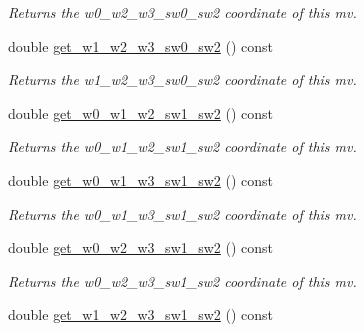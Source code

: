 \begin{DoxyCompactItemize}
\begin{DoxyCompactList}\small\item\em Returns the w0\-\_\-w2\-\_\-w3\-\_\-sw0\-\_\-sw2 coordinate of this mv. \end{DoxyCompactList}\item 
\hypertarget{classe3ga_1_1mv_abbe5b7757b57fbc209631c81670618ac}{double \hyperlink{classe3ga_1_1mv_abbe5b7757b57fbc209631c81670618ac}{get\-\_\-w1\-\_\-w2\-\_\-w3\-\_\-sw0\-\_\-sw2} () const }\label{classe3ga_1_1mv_abbe5b7757b57fbc209631c81670618ac}

\begin{DoxyCompactList}\small\item\em Returns the w1\-\_\-w2\-\_\-w3\-\_\-sw0\-\_\-sw2 coordinate of this mv. \end{DoxyCompactList}\item 
\hypertarget{classe3ga_1_1mv_a51233268a3e102326095f4abffc099a4}{double \hyperlink{classe3ga_1_1mv_a51233268a3e102326095f4abffc099a4}{get\-\_\-w0\-\_\-w1\-\_\-w2\-\_\-sw1\-\_\-sw2} () const }\label{classe3ga_1_1mv_a51233268a3e102326095f4abffc099a4}

\begin{DoxyCompactList}\small\item\em Returns the w0\-\_\-w1\-\_\-w2\-\_\-sw1\-\_\-sw2 coordinate of this mv. \end{DoxyCompactList}\item 
\hypertarget{classe3ga_1_1mv_af45a5879d1a66440db14a29d2edb807d}{double \hyperlink{classe3ga_1_1mv_af45a5879d1a66440db14a29d2edb807d}{get\-\_\-w0\-\_\-w1\-\_\-w3\-\_\-sw1\-\_\-sw2} () const }\label{classe3ga_1_1mv_af45a5879d1a66440db14a29d2edb807d}

\begin{DoxyCompactList}\small\item\em Returns the w0\-\_\-w1\-\_\-w3\-\_\-sw1\-\_\-sw2 coordinate of this mv. \end{DoxyCompactList}\item 
\hypertarget{classe3ga_1_1mv_aefc5ec7c67ebe81aaba6a816d53b1672}{double \hyperlink{classe3ga_1_1mv_aefc5ec7c67ebe81aaba6a816d53b1672}{get\-\_\-w0\-\_\-w2\-\_\-w3\-\_\-sw1\-\_\-sw2} () const }\label{classe3ga_1_1mv_aefc5ec7c67ebe81aaba6a816d53b1672}

\begin{DoxyCompactList}\small\item\em Returns the w0\-\_\-w2\-\_\-w3\-\_\-sw1\-\_\-sw2 coordinate of this mv. \end{DoxyCompactList}\item 
\hypertarget{classe3ga_1_1mv_aed48706befb8f917ddd7529fc2b0a112}{double \hyperlink{classe3ga_1_1mv_aed48706befb8f917ddd7529fc2b0a112}{get\-\_\-w1\-\_\-w2\-\_\-w3\-\_\-sw1\-\_\-sw2} () const }\label{classe3ga_1_1mv_aed48706befb8f917ddd7529fc2b0a112}


\end{DoxyCompactItemize}
